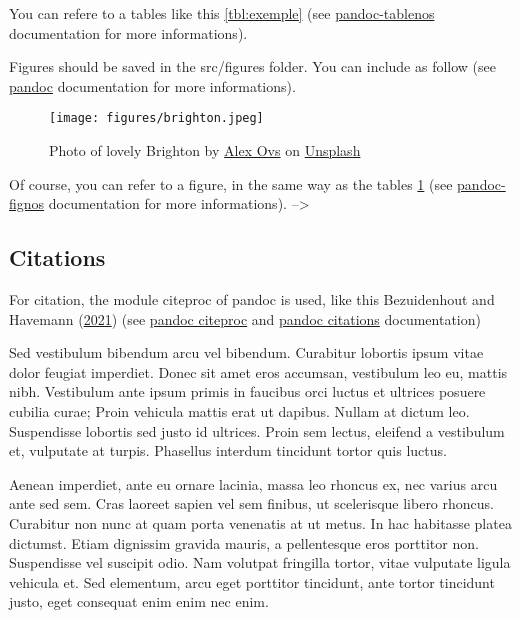 \documentclass[9pt,biorxiv,doublespacing,lineno]{lapreprint}
\newcounter{tableno}
\begin{document}
You can refere to a tables like this \cref{tbl:exemple} (see
\href{https://github.com/tomduck/pandoc-tablenos}{pandoc-tablenos}
documentation for more informations).

Figures should be saved in the src/figures folder. You can include as
follow (see
\href{https://pandoc.org/MANUAL.html\#extension-implicit_figures}{pandoc}
documentation for more informations).

\begin{figure}
\hypertarget{fig:brighton}{%
\centering
\texttt{[image: figures/brighton.jpeg]}
\caption{Photo of lovely Brighton by
\href{https://unsplash.com/es/@sanekovs?utm_source=unsplash\&utm_medium=referral\&utm_content=creditCopyText}{Alex
Ovs} on
\href{https://unsplash.com/s/photos/brighton?utm_source=unsplash\&utm_medium=referral\&utm_content=creditCopyText}{Unsplash}}\label{fig:brighton}
}
\end{figure}

Of course, you can refer to a figure, in the same way as the tables
\cref{fig:brighton} (see
\href{https://github.com/tomduck/pandoc-fignos}{pandoc-fignos}
documentation for more informations). --\textgreater{}

\hypertarget{citations}{%
\subsection{Citations}\label{citations}}

For citation, the module citeproc of pandoc is used, like this
Bezuidenhout and Havemann
(\protect\hyperlink{ref-Bezuidenhout2021}{2021}) (see
\href{https://pandoc.org/MANUAL.html\#citations}{pandoc citeproc} and
\href{https://pandoc.org/MANUAL.html\#extension-citations}{pandoc
citations} documentation)

Sed vestibulum bibendum arcu vel bibendum. Curabitur lobortis ipsum
vitae dolor feugiat imperdiet. Donec sit amet eros accumsan, vestibulum
leo eu, mattis nibh. Vestibulum ante ipsum primis in faucibus orci
luctus et ultrices posuere cubilia curae; Proin vehicula mattis erat ut
dapibus. Nullam at dictum leo. Suspendisse lobortis sed justo id
ultrices. Proin sem lectus, eleifend a vestibulum et, vulputate at
turpis. Phasellus interdum tincidunt tortor quis luctus.

Aenean imperdiet, ante eu ornare lacinia, massa leo rhoncus ex, nec
varius arcu ante sed sem. Cras laoreet sapien vel sem finibus, ut
scelerisque libero rhoncus. Curabitur non nunc at quam porta venenatis
at ut metus. In hac habitasse platea dictumst. Etiam dignissim gravida
mauris, a pellentesque eros porttitor non. Suspendisse vel suscipit
odio. Nam volutpat fringilla tortor, vitae vulputate ligula vehicula et.
Sed elementum, arcu eget porttitor tincidunt, ante tortor tincidunt
justo, eget consequat enim enim nec enim.
\end{document}
